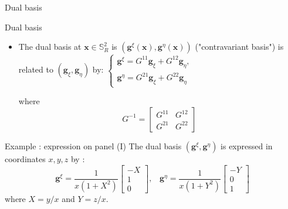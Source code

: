 \documentclass[11pt]{beamer}
\begin{document}
\begin{frame}{Dual basis}
\begin{block}{Dual basis}
\begin{itemize}
\item The dual basis at $\mathbf{x} \in \mathbb{S}^2_R $ is $(\mathbf{g}^\xi(\mathbf{x}),\mathbf{g}^\eta(\mathbf{x}))$ ("contravariant basis") is related to $(\mathbf{g}_\xi,\mathbf{g}_\eta)$ by:
$
\left\{
\begin{array}{c}
\mathbf{g}^\xi=G^{11} \mathbf{g}_\xi+G^{12} \mathbf{g}_\eta,\\
\mathbf{g}^\eta=G^{21} \mathbf{g}_\xi+G^{22} \mathbf{g}_\eta
\end{array}
\right.
$

where
\begin{equation}
G^{-1}=
\left[
\begin{array}{cc}
G^{11}& G^{12}\\
G^{21}& G^{22}
\end{array}
\right]
\end{equation}
\end{itemize}
\end{block}

\begin{block}{Example : expression on panel (I)}
The dual basis $(\mathbf{g}^\xi, \mathbf{g}^\eta)$ is expressed in coordinates $x,y,z$ by :
\begin{equation}
\label{eq:1001.4}
\mathbf{g}^\xi=
\frac{1}{x(1+X^2)} \left[
\begin{array}{c}
-X\\
1\\
0
\end{array}
\right]
,\;\;\;
\mathbf{g}^\eta=
\frac{1}{x(1+Y^2)} \left[
\begin{array}{c}
-Y\\
0\\
1
\end{array}
\right]
\end{equation}
where $X = y/x$ and $Y = z/x$.
\end{block}
\end{frame}
\end{document}
